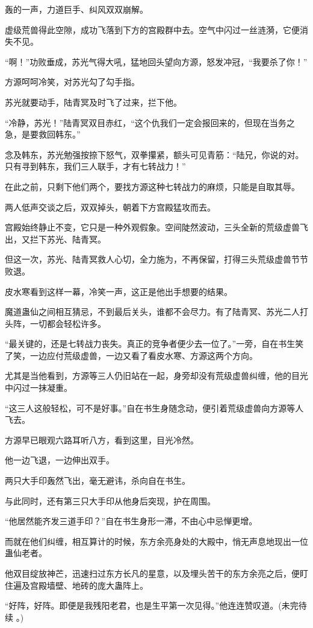 \begin{this_body}
轰的一声，力道巨手、纠风双双崩解。

虚级荒兽得此空隙，成功飞落到下方的宫殿群中去。空气中闪过一丝涟漪，它便消失不见。

“啊！”功败垂成，苏光气得大吼，猛地回头望向方源，怒发冲冠，“我要杀了你！”

方源呵呵冷笑，对苏光勾了勾手指。

苏光就要动手，陆青冥及时飞了过来，拦下他。

“冷静，苏光！”陆青冥双目赤红，“这个仇我们一定会报回来的，但现在当务之急，是要救回韩东。”

念及韩东，苏光勉强按捺下怒气，双拳攥紧，额头可见青筋：“陆兄，你说的对。只有寻到韩东，我们三人联手，才有七转战力！”

在此之前，只剩下他们两个，要找方源这种七转战力的麻烦，只能是自取其辱。

两人低声交谈之后，双双掉头，朝着下方宫殿猛攻而去。

宫殿始终静止不变，它只是一种外观假象。空间陡然波动，三头全新的荒级虚兽飞出，又拦下苏光、陆青冥。

但这一次，苏光、陆青冥救人心切，全力施为，不再保留，打得三头荒级虚兽节节败退。

皮水寒看到这样一幕，冷笑一声，这正是他出手想要的结果。

魔道蛊仙之间相互猜忌，不到最后关头，谁都不会尽力。有了陆青冥、苏光二人打头阵，一切都会轻松许多。

“最关键的，还是七转战力丧失。真正的竞争者便少去一位了。”一旁，自在书生笑了笑，一边应付荒级虚兽，一边又看了看皮水寒、方源这两个方向。

尤其是当他看到，方源等三人仍旧站在一起，身旁却没有荒级虚兽纠缠，他的目光中闪过一抹凝重。

“这三人这般轻松，可不是好事。”自在书生身随念动，便引着荒级虚兽向方源等人飞去。

方源早已眼观六路耳听八方，看到这里，目光冷然。

他一边飞退，一边伸出双手。

两只大手印轰然飞出，毫无避讳，杀向自在书生。

与此同时，还有第三只大手印从他身后突现，护在周围。

“他居然能齐发三道手印？”自在书生身形一滞，不由心中忌惮更增。

而就在他们纠缠，相互算计的时候，东方余亮身处的大殿中，悄无声息地现出一位蛊仙老者。

他双目绽放神芒，迅速扫过东方长凡的星意，以及埋头苦干的东方余亮之后，便盯住遍及宫殿墙壁、地砖的庞大蛊阵上。

“好阵，好阵。即便是我残阳老君，也是生平第一次见得。”他连连赞叹道。(未完待续 。)

\end{this_body}

